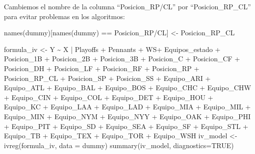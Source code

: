 \documentclass[
]{article}
\newenvironment{Shaded}{\begin{snugshade}}{\end{snugshade}}
\newcommand{\AttributeTok}[1]{\textcolor[rgb]{0.77,0.63,0.00}{#1}}
\newcommand{\ConstantTok}[1]{\textcolor[rgb]{0.00,0.00,0.00}{#1}}
\newcommand{\FunctionTok}[1]{\textcolor[rgb]{0.00,0.00,0.00}{#1}}
\newcommand{\NormalTok}[1]{#1}
\newcommand{\OtherTok}[1]{\textcolor[rgb]{0.56,0.35,0.01}{#1}}
\newcommand{\SpecialCharTok}[1]{\textcolor[rgb]{0.00,0.00,0.00}{#1}}
\newcommand{\StringTok}[1]{\textcolor[rgb]{0.31,0.60,0.02}{#1}}
\begin{document}
Cambiemos el nombre de la columna ``Posicion\_RP/CL'' por
``Posicion\_RP\_CL'' para evitar problemas en los algoritmos:

\begin{Shaded}
\begin{Highlighting}[]
\FunctionTok{names}\NormalTok{(dummy)[}\FunctionTok{names}\NormalTok{(dummy) }\SpecialCharTok{==} \StringTok{\textquotesingle{}Posicion\_RP/CL\textquotesingle{}}\NormalTok{] }\OtherTok{\textless{}{-}} \StringTok{\textquotesingle{}Posicion\_RP\_CL\textquotesingle{}}
\end{Highlighting}
\end{Shaded}

\begin{Shaded}
\begin{Highlighting}[]
\NormalTok{formula\_iv }\OtherTok{\textless{}{-}}\NormalTok{ Y }\SpecialCharTok{\textasciitilde{}}\NormalTok{ X }\SpecialCharTok{|}\NormalTok{ Playoffs }\SpecialCharTok{+}\NormalTok{ Pennants }\SpecialCharTok{+}\NormalTok{ WS}\SpecialCharTok{+}\NormalTok{ Equipos\_estado }\SpecialCharTok{+}\NormalTok{ Posicion\_1B }\SpecialCharTok{+}\NormalTok{ Posicion\_2B }\SpecialCharTok{+}\NormalTok{ Posicion\_3B }\SpecialCharTok{+}\NormalTok{ Posicion\_C }\SpecialCharTok{+}\NormalTok{ Posicion\_CF }\SpecialCharTok{+}\NormalTok{ Posicion\_DH }\SpecialCharTok{+}\NormalTok{ Posicion\_LF }\SpecialCharTok{+}\NormalTok{ Posicion\_RF }\SpecialCharTok{+}\NormalTok{ Posicion\_RP }\SpecialCharTok{+}\NormalTok{ Posicion\_RP\_CL }\SpecialCharTok{+}\NormalTok{  Posicion\_SP }\SpecialCharTok{+}\NormalTok{ Posicion\_SS }\SpecialCharTok{+}\NormalTok{ Equipo\_ARI }\SpecialCharTok{+}\NormalTok{ Equipo\_ATL }\SpecialCharTok{+}\NormalTok{ Equipo\_BAL }\SpecialCharTok{+}\NormalTok{ Equipo\_BOS }\SpecialCharTok{+}\NormalTok{ Equipo\_CHC }\SpecialCharTok{+}\NormalTok{ Equipo\_CHW }\SpecialCharTok{+}\NormalTok{ Equipo\_CIN }\SpecialCharTok{+}\NormalTok{  Equipo\_COL }\SpecialCharTok{+}\NormalTok{ Equipo\_DET }\SpecialCharTok{+}\NormalTok{ Equipo\_HOU }\SpecialCharTok{+}\NormalTok{  Equipo\_KC  }\SpecialCharTok{+}\NormalTok{  Equipo\_LAA }\SpecialCharTok{+}\NormalTok{  Equipo\_LAD }\SpecialCharTok{+}\NormalTok{  Equipo\_MIA }\SpecialCharTok{+}\NormalTok{ Equipo\_MIL }\SpecialCharTok{+}\NormalTok{ Equipo\_MIN }\SpecialCharTok{+}\NormalTok{  Equipo\_NYM }\SpecialCharTok{+}\NormalTok{  Equipo\_NYY }\SpecialCharTok{+}\NormalTok{   Equipo\_OAK }\SpecialCharTok{+}\NormalTok{ Equipo\_PHI }\SpecialCharTok{+}\NormalTok{ Equipo\_PIT }\SpecialCharTok{+}\NormalTok{   Equipo\_SD  }\SpecialCharTok{+}\NormalTok{  Equipo\_SEA }\SpecialCharTok{+}\NormalTok{  Equipo\_SF  }\SpecialCharTok{+}\NormalTok{  Equipo\_STL }\SpecialCharTok{+}\NormalTok{ Equipo\_TB  }\SpecialCharTok{+}\NormalTok{  Equipo\_TEX }\SpecialCharTok{+}\NormalTok{ Equipo\_TOR }\SpecialCharTok{+}\NormalTok{ Equipo\_WSH }
\NormalTok{iv\_model }\OtherTok{\textless{}{-}} \FunctionTok{ivreg}\NormalTok{(formula\_iv, }\AttributeTok{data =}\NormalTok{ dummy)}
\FunctionTok{summary}\NormalTok{(iv\_model, }\AttributeTok{diagnostics=}\ConstantTok{TRUE}\NormalTok{)}
\end{Highlighting}
\end{Shaded}
\end{document}
